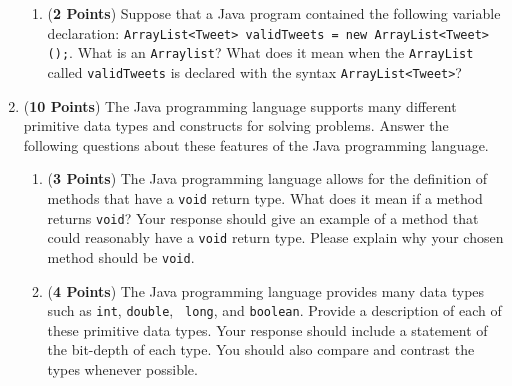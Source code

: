 \documentclass[12pt]{article}
\begin{document}
\begin{enumerate}
\begin{enumerate}

% 

\item ({\bf 2 Points}) Suppose that a Java program contained the
  following variable declaration: {\tt ArrayList<Tweet> validTweets =
    new ArrayList<Tweet>();}.  What is an {\tt Arraylist}?  What does
  it mean when the {\tt ArrayList} called {\tt validTweets} is
  declared with the syntax {\tt ArrayList<Tweet>}?

\end{enumerate}

\newpage

\item ({\bf 10 Points}) The Java programming language supports many different primitive data types and constructs for
  solving problems.  Answer the following questions about these features of the Java programming language.

\begin{enumerate}

\item ({\bf 3 Points}) The Java programming language allows for the definition of methods that have a {\tt void} return
  type.  What does it mean if a method returns {\tt void}?  Your response should give an example of a method that could
  reasonably have a {\tt void} return type.  Please explain why your chosen method should be {\tt void}.

  
\item ({\bf 4 Points}) The Java programming language provides many data types such as {\tt int}, {\tt double}, {\tt
  long}, and {\tt boolean}.  Provide a description of each of these primitive data types.  Your response should include
  a statement of the bit-depth of each type. You should also compare and contrast the types whenever possible.
  


\end{enumerate}
\end{enumerate}
\end{document}
